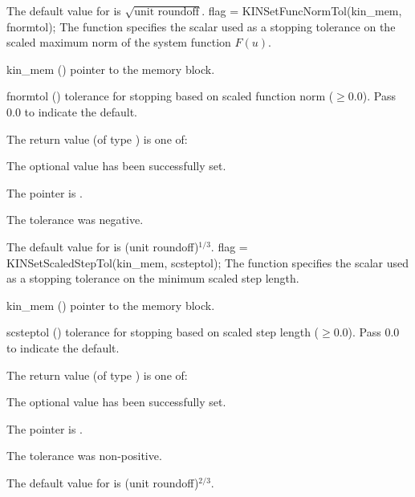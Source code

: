 {
  The default value for  is $\sqrt{\text{unit roundoff}}$.
}
{
flag = KINSetFuncNormTol(kin\_mem, fnormtol);
}
{
  The function  specifies the scalar used as a stopping
  tolerance on the scaled maximum norm of the system function $F(u)$.
}
{
  \begin{args}[fnormtol]
  \item[kin\_mem] ()
    pointer to the {\kinsol} memory block.
  \item[fnormtol] ()
    tolerance for stopping based on scaled function norm ($\geq 0.0$).
    Pass $0.0$ to indicate the default.
  \end{args}
}
{
  The return value  (of type ) is one of:
  \begin{args}
  \item[\Id{KIN\_SUCCESS}] 
    The optional value has been successfully set.
  \item[\Id{KIN\_MEM\_NULL}]
    The  pointer is .
  \item[\Id{KIN\_ILL\_INPUT}]
    The tolerance was negative.
  \end{args}
}
{
  The default value for  is (unit roundoff)$^{1/3}$.
}
{
flag = KINSetScaledStepTol(kin\_mem, scsteptol);
}
{
  The function  specifies the scalar used
  as a stopping tolerance on the minimum scaled step length.
}
{
  \begin{args}[scsteptol]
  \item[kin\_mem] ()
    pointer to the {\kinsol} memory block.
  \item[scsteptol] ()
    tolerance for stopping based on scaled step length ($\geq 0.0$).
    Pass $0.0$ to indicate the default. 
  \end{args}
}
{
  The return value  (of type ) is one of:
  \begin{args}
  \item[\Id{KIN\_SUCCESS}] 
    The optional value has been successfully set.
  \item[\Id{KIN\_MEM\_NULL}]
    The  pointer is .
  \item[\Id{KIN\_ILL\_INPUT}]
    The tolerance was non-positive.
  \end{args}
}
{
  The default value for  is (unit roundoff)$^{2/3}$.
}
